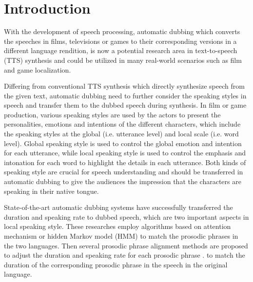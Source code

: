
\section{Introduction}

With the development of speech processing, automatic dubbing which converts the speeches in films, televisions or games to their corresponding versions in a different language rendition,
is now a potential research area in text-to-speech (TTS) synthesis and could be utilized in many real-world scenarios such as film and game localization.

Differing from conventional TTS synthesis \citep{wang2017tacotron, shen2018natural, li2019neural, ren2020fastspeech, kim2021conditional} 
which %
directly synthesize speech from the given text,
automatic dubbing need to further consider the speaking styles in speech
and transfer them to the dubbed speech during synthesis.
In film or game production, various speaking styles are used by the actors to
present the personalities, emotions and intentions of the different characters,
which include the speaking styles at the global (i.e. utterance level) and local scale (i.e. word level).
Global speaking style \citep{wang2018style} is used to control the global emotion and intention for each utterance,
while local speaking style \citep{li_inferring_2022} is used to control the emphasis and intonation for each word to highlight the details in each utterance.
Both kinds of speaking style are 
crucial for speech understanding 
and should be transferred in automatic dubbing
to give the audiences the impression that the characters are speaking in their native tongue.

State-of-the-art automatic dubbing systems \citep{9747158} have successfully transferred the duration and speaking rate to dubbed speech,
which are two important aspects in local speaking style.
These researches employ algorithms based on
attention mechanism \citep{oktem2019prosodic} or hidden Markov model (HMM) \citep{federico2020evaluating, virkar2022prosodic}
to match the prosodic phrases in the two languages.
Then several prosodic phrase alignment methods \citep{oktem2019prosodic} are proposed to adjust the duration \citep{9747158}
and speaking rate for each prosodic phrase \citep{virkar2021improvements}.
to match the duration of the corresponding prosodic phrase in the speech in the original language.

